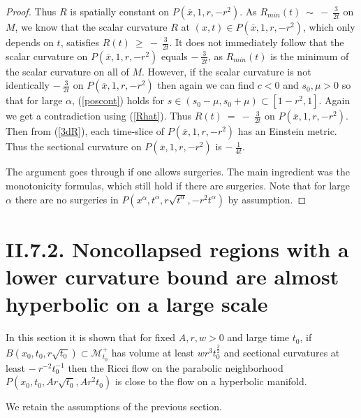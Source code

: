 \documentclass[12pt]{amsart}
\newcommand{\al}{\alpha}
\newcommand{\M}{{\mathcal M}}
\numberwithin{equation}{section}
\theoremstyle{plain}
\theoremstyle{definition}
\theoremstyle{remark}
\begin{document}
\begin{proof}
Thus $R$ is spatially constant on 
$P(\overline{x}, 1, r, -r^2)$.
As $R_{min}(t) \: \sim \: - \: \frac{3}{2t}$ on $M$, we know that the
scalar curvature $R$ at $(x,t) \in P(\overline{x}, 1, r, -r^2)$, which
only depends on $t$, satisfies
$R(t) \: \ge \: - \: \frac{3}{2t}$. It does not immediately follow that
the scalar curvature on $P(\overline{x}, 1, r, -r^2)$
equals $- \: \frac{3}{2t}$,  as $R_{min}(t)$ is the minimum of
the scalar curvature on all of $M$. However, if the scalar curvature is not identically
$- \: \frac{3}{2t}$ on $P(\overline{x}, 1, r, -r^2)$ then
again we can find $c<0$ and $s_0, \mu > 0$ so that
for large $\alpha$, (\ref{poscont}) holds for 
$s \in (s_0-\mu, s_0 +\mu) \subset [1-r^2, 1]$.
Again we get a contradiction using (\ref{Rhat}).  Thus 
$R(t) \: = \: - \: \frac{3}{2t}$ on $P(\overline{x}, 1, r, -r^2)$.
Then from (\ref{3dR}),
each time-slice of $P(\overline{x}, 1, r, -r^2)$
has an Einstein metric.  Thus the sectional curvature on
$P(\overline{x}, 1, r, -r^2)$ is $- \: \frac{1}{4t}$.


The argument goes through if one allows surgeries.
The main ingredient was the monotonicity formulas, which
still hold if there are surgeries. Note that for large 
$\al$ there are no surgeries in $P(x^\al, t^\al, r \sqrt{t^\al}, - r^2 t^\al)$
by assumption.
\end{proof}

\section{II.7.2. Noncollapsed regions with a lower curvature bound are
almost hyperbolic on a large scale}

In this section it is shown that for fixed $A, r,w > 0$ and large time $t_0$, if 
$B(x_0, t_0, r \sqrt{t_0}) \subset \M_{t_0}^+$ has volume at least 
$wr^3 t_0^{\frac32}$ and sectional curvatures at least
$- \: r^{-2} t_0^{-1}$ then the Ricci flow on the parabolic neighborhood 
$P(x_0, t_0, Ar \sqrt{t_0}, A r^2 t_0)$ is close to the flow on a
hyperbolic manifold.

We retain the assumptions of the previous section.
\end{document}
